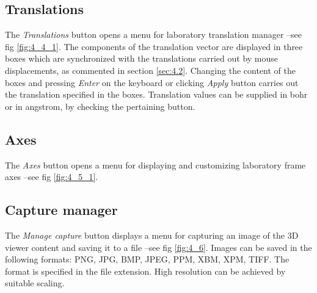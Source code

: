 \documentclass[10pt]{article}
\begin{document}
\subsection{Translations \label{sec:4.4}}

The {\it Translations} button opens a menu for laboratory translation manager --see fig \ref{fig:4_4_1}.
The components of the translation vector are displayed in three boxes which
are synchronized with the translations carried out by mouse displacements,
as commented in section \ref{sec:4.2}. Changing the content of the boxes and pressing {\it Enter} on the keyboard or clicking {\it Apply} button carries out the translation specified in the boxes.
Translation values can be supplied in bohr or in angstrom, by checking the pertaining button.

\subsection{Axes \label{sec:4.5}}

The {\it Axes} button opens a menu for displaying 
and customizing laboratory frame axes --see fig \ref{fig:4_5_1}. 


\subsection{Capture manager \label{sec:4.6}}

The {\it Manage capture} button displays a menu for capturing an image of the 3D viewer content and saving it to a file --see fig \ref{fig:4_6}. Images can be saved in the following formats: PNG, JPG, BMP, JPEG, PPM, XBM, XPM, TIFF. The format is specified in the file extension.
High resolution can be achieved by suitable scaling.
\end{document}
